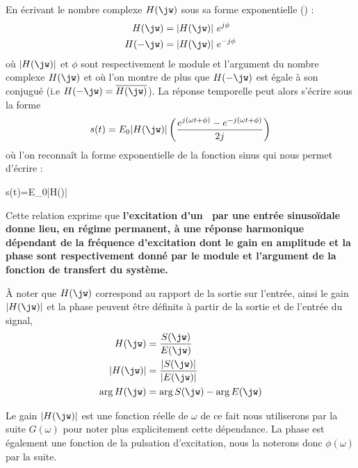 En écrivant le nombre complexe $H(\jw)$ sous sa forme exponentielle 
() :
\begin{align*}
    H(\jw)  &= |H(\jw)| e^{j\phi} \\
    H(-\jw) &= |H(\jw)| e^{-j\phi}
\end{align*}
où $|H(\jw)|$ et $\phi$ sont respectivement le module et l'argument du nombre
complexe $H(\jw)$ 
et où l'on montre de plus que $H(-\jw)$ est égale à son conjugué (i.e 
$H(-\jw)=\overline{H(\jw)}$).
%
%
%
%
La réponse temporelle peut alors s'écrire sous la forme 
\begin{align*}
s(t)=E_0|H(\jw)|\left(\dfrac{e^{j(\omega t+\phi)}
    -e^{-j(\omega t+\phi)}}{2j}\right)
\end{align*}
où l'on reconnaît la forme exponentielle de la fonction sinus qui nous permet
d'écrire :
\begin{bequation}
    s(t)=E_0|H(\jw)|\label{eq-rh}
\end{bequation}
Cette relation exprime que \textbf{l'excitation d'un {}
~par une entrée sinuso\"idale donne lieu, en régime permanent, à une réponse 
harmonique dépendant de la fréquence d'excitation dont le gain en amplitude et
la phase sont respectivement donné par le module et l'argument de la fonction
de transfert du système.}

\`A noter que $H(\jw)$ correspond au rapport de la sortie sur l'entrée,
ainsi le gain $|H(\jw)|$ et la phase peuvent être définits à partir de la 
sortie et de l'entrée du signal,
\begin{align*}
    H(\jw) &= \dfrac{S(\jw)}{E(\jw)} \\
    |H(\jw)|&= \dfrac{|S(\jw)|}{|E(\jw)|} \\
    \arg{H(\jw)}&=\arg{S(\jw)}-\arg{E(\jw)}
\end{align*}

Le gain $|H(\jw)|$ est une fonction réelle de $\omega$ de ce fait nous 
utiliserons par la suite $G(\omega)$ pour noter plus explicitement cette 
dépendance. La phase est également une fonction de la pulsation d'excitation, 
nous la noterons donc $\phi(\omega)$ par la suite.


